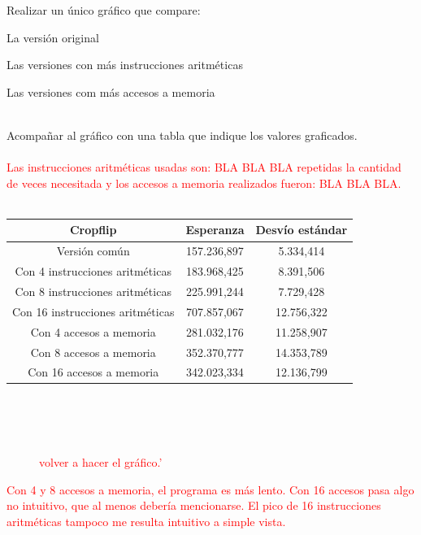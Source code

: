 Realizar un único gráfico que compare:
\begin{inparaenum}
    \item La versión original
    \item Las versiones con más instrucciones aritméticas
    \item Las versiones com más accesos a memoria
\end{inparaenum}
\\
Acompañar al gráfico con una tabla que indique los valores graficados. \\
\\
\textcolor{red}{Las instrucciones aritm\'eticas usadas son: BLA BLA BLA repetidas la cantidad de veces necesitada y los accesos a memoria realizados fueron: BLA BLA BLA.}\\
\\
 \begin{tabular}[c]{|c|c|c|}
	\hline
		Cropflip & Esperanza & Desv\'io est\'andar\\
		\hline
Versi\'on com\'un & 157.236,897 & 5.334,414 \\
\hline
Con 4 instrucciones aritméticas & 183.968,425 & 8.391,506 \\
\hline
Con 8 instrucciones aritméticas & 225.991,244 & 7.729,428 \\
\hline
Con 16 instrucciones aritméticas & 707.857,067 & 12.756,322 \\
\hline
Con 4 accesos a memoria & 281.032,176 & 11.258,907 \\
\hline
Con 8 accesos a memoria & 352.370,777 & 14.353,789 \\
\hline
Con 16 accesos a memoria & 342.023,334 & 12.136,799 \\
\hline
	\end{tabular}\\\\
\\

\begin{figure}[h!]
  \begin{center}
 \textcolor{red}{volver a hacer el gr\'afico.'}
  \end{center}
\end{figure}
\textcolor{red}{Con 4 y 8 accesos a memoria, el programa es m\'as lento. Con 16 accesos pasa algo no intuitivo, que al menos deber\'ia mencionarse. El pico de 16 instrucciones aritm\'eticas tampoco me resulta intuitivo a simple vista.}

  \newpage
